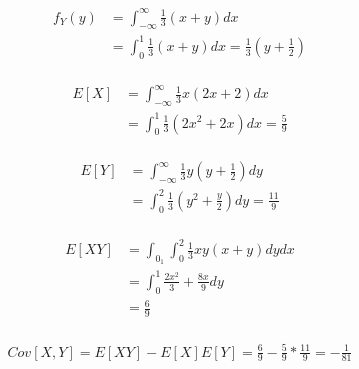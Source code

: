 \documentclass[paper=a4, fontsize=11pt]{article}
\numberwithin{equation}{section} %
\numberwithin{figure}{section} %
\numberwithin{table}{section} %
\begin{document}
\begin{align}
\begin{split}
    f_Y(y) &= \int_{-\infty}^{\infty} \frac{1}{3}(x + y)dx \\
    &= \int_{0}^{1} \frac{1}{3}(x + y)dx = \frac{1}{3}(y + \frac{1}{2})
\end{split}
\end{align}

\begin{align}
\begin{split}
    E[X] &= \int_{-\infty}^{\infty} \frac{1}{3}x(2x + 2)dx \\
    &= \int_{0}^{1} \frac{1}{3}(2x^2 + 2x)dx = \frac{5}{9}
\end{split}
\end{align}

\begin{align}
\begin{split}
    E[Y] &= \int_{-\infty}^{\infty} \frac{1}{3}y(y + \frac{1}{2})dy \\
    &= \int_{0}^{2} \frac{1}{3}(y^2 + \frac{y}{2})dy = \frac{11}{9}
\end{split}
\end{align}

\begin{align}
\begin{split}
    E[XY] &= \int_{0}_{1}\int_{0}^{2} \frac{1}{3}xy(x + y)dydx\\
    &= \int_{0}^{1} \frac{2x^2}{3} + \frac{8x}{9} dy\\
    &= \frac{6}{9}
\end{split}
\end{align}

\begin{align}
\begin{split}
    Cov[X,Y] = E[XY] - E[X]E[Y] = \frac{6}{9} - \frac{5}{9} * \frac{11}{9} = -\frac{1}{81}
\end{split}
\end{align}
\end{document}
